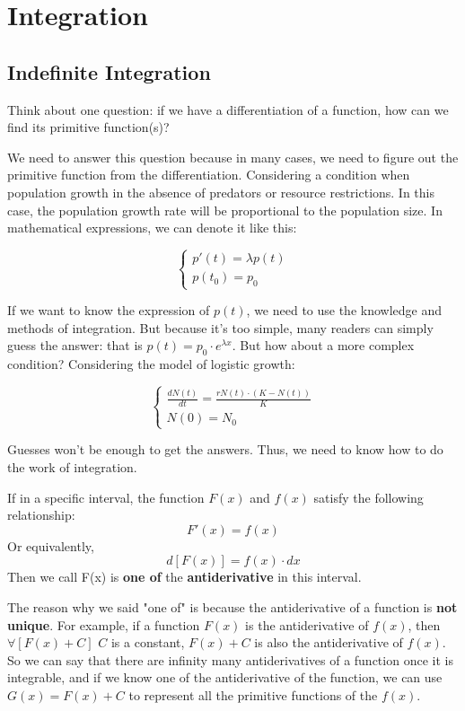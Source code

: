 \section{Integration}

\subsection{Indefinite Integration}
Think about one question: if we have a differentiation of a function, how can we find its primitive function(s)?

We need to answer this question because in many cases, we need to figure out the primitive function from the differentiation. Considering a condition when population growth in the absence of predators or resource restrictions. In this case, the population growth rate will be proportional to the population size. In mathematical expressions, we can denote it like this:

\[
\begin{cases}
    p'(t) = \lambda p(t) \\
    p(t_0) = p_0
\end{cases}
\]

If we want to know the expression of $p(t)$, we need to use the knowledge and methods of integration. But because it's too simple, many readers can simply guess the answer: that is $p(t)=p_0 \cdot e^{\lambda x}$. But how about a more complex condition? Considering the model of logistic growth:

\[
\begin{cases}
    \frac{dN(t)}{dt} = \frac{rN(t) \cdot (K-N(t))}{K} \\
    N(0) = N_0
\end{cases}
\]

Guesses won't be enough to get the answers. Thus, we need to know how to do the work of integration.

\begin{definition}
If in a specific interval, the function $F(x)$ and $f(x)$ satisfy the following relationship:
\[F'(x) = f(x)\]
Or equivalently,
\[d[F(x)]=f(x)\cdot dx\]
Then we call F(x) is \textbf{one of} the \textbf{antiderivative} in this interval.
\end{definition}

The reason why we said "one of" is because the antiderivative of a function is \textbf{not unique}. For example, if a function $F(x)$ is the antiderivative of $f(x)$, then $\forall [F(x)+C]$ $C$ is a constant,
$F(x)+C$ is also the antiderivative of $f(x)$. So we can say that there are infinity many antiderivatives of a function once it is integrable, and if we know one of the antiderivative of the function, we can use $G(x) = F(x)+C$ to represent all the primitive functions of the $f(x)$.

